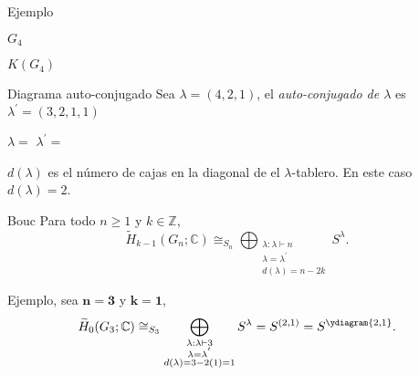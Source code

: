 \documentclass[final,xcolor=svgnames]{beamer}
\begin{document}
\begin{frame}{}
\begin{columns}
\begin{column}{0.5\textwidth}
\begin{block}{Ejemplo}
\begin{minipage}{0.3\linewidth}
            $G_{4}$
          \end{minipage}
        \begin{minipage}{0.3\linewidth}    
          \centering

            $K(G_{4})$
                  \end{minipage}
      \end{block}

      \begin{block}{Diagrama auto-conjugado}
        Sea $\lambda=(4,2,1)$, el \textit{auto-conjugado de $\lambda$} 
        es $\lambda^{'}=(3,2,1,1)$
        \begin{center}
          $\lambda=$ \quad
          $\lambda^{'}=$
        \end{center}
        $d(\lambda)$ es el número de cajas en la diagonal de el
        $\lambda$-tablero. En este caso $d(\lambda)=2$.
      \end{block}

      \begin{block}{Bouc}
          Para todo $n\geq1$ y $k\in \mathbb{Z}$,
          \begin{equation*}
            \widetilde H_{k-1}(G_{n};\mathbb{C})\cong_{S_{n}}\bigoplus_{\substack{\lambda:\lambda\vdash n\\
              \lambda=\lambda^{'}\\d(\lambda)=n-2k}} S^{\lambda}.
          \end{equation*}
       \end{block}
       
        \begin{block}{Ejemplo, sea $\boldsymbol{n=3}$ y $\boldsymbol{k=1}$,}
          \begin{equation*}
            \widetilde H_{0}(G_{3};\mathbb{C})\cong_{S_{3}}\bigoplus_{\substack{\lambda:\lambda\vdash 3\\
              \lambda=\lambda^{'}\\d(\lambda)=3-2(1)=1}} S^{\lambda}=S^{(2,1)}=S^{\ydiagram{2,1}}.
          \end{equation*}
       \end{block}


\end{column}
\end{columns}
\end{frame}
\end{document}
